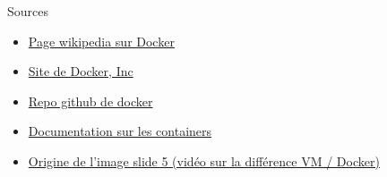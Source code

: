  \begin{frame}[noframenumbering]{Sources}
 \begin{itemize}
     \item \href{https://en.wikipedia.org/wiki/Docker_(software)}{Page wikipedia sur Docker}
     \item \href{https://www.docker.com/}{Site de Docker, Inc}
     \item \href{https://github.com/docker/docker-ce}{Repo github de docker}
     \item \href{https://www.aquasec.com/wiki/display/containers/}{Documentation sur les containers}
     \item \href{https://www.youtube.com/watch?v=TvnZTi_gaNc}{Origine de l'image slide 5 (vidéo sur la différence VM / Docker)}
 \end{itemize}
 \end{frame}
